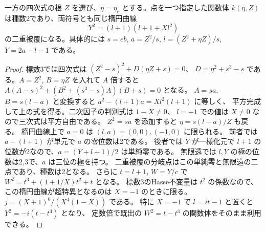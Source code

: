 \begin{corollary}\label{cor:rank-fifteen-unit-elliptic-quotient}
一方の四次式の根 $Z$ を選び、$\eta=\eta_e$ とする。点を一つ指定した関数体
$k(\eta,Z)$ は種数2であり、両符号とも同じ楕円曲線
\[
                 Y^2=(l+1)(l+1+Xl^2)
\]
の二重被覆になる。具体的には $s=e b$, $a=Z^2/s$,
$l=(Z^2+\eta Z)/s$, $Y=2a-l-1$ である。
\end{corollary}
\begin{proof}
標数3では四次式は $(Z^2-s)^2+D(\eta Z+s)=0$、
$D=\eta^2+s^3-s$ である。$A=Z^2$, $B=\eta Z$ を入れて $A$ 倍すると
$A(A-s)^2+(B^2+(s^3-s)A)(B+s)=0$ となる。
$A=sa$, $B=s(l-a)$ と変換すると $a^2-(l+1)a=Xl^2(l+1)$ に等しく、
平方完成して上の式を得る。二次因子の判別式は $1-X\ne0$、
$l=-1$ での値は $X\ne0$ なので三次式は平方自由である。
$Z^2=sa$ を添加すると $\eta=s(l-a)/Z$ も戻る。
楕円曲線上で $a=0$ は $(l,a)=(0,0),(-1,0)$ に限られる。
前者では $a-(l+1)$ が単元で $a$ の零位数は2である。
後者では $Y$ が一様化元で $l+1$ の位数が2なので、$a=(Y+l+1)/2$ は単純零である。
無限遠では $l,Y$ の極の位数は2,3で、$a$ は三位の極を持つ。
二重被覆の分岐点はこの単純零と無限遠の二点であり、種数は2となる。
さらに $t=l+1$, $W=Y/c$ で $W^2=t^3+(1+1/X)t^2+t$ となる。
標数3のHasse不変量は $t^2$ の係数なので、この楕円曲線が超特異となるのは
$X=-1$ のときに限る。$j=(X+1)^6/(X^4(1-X))$ である。
特に $X=-1$ で $l=i t-1$ と置くと $Y^2=-i(t-t^3)$ となり、
定数倍で既出の $W^2=t-t^3$ の関数体をそのまま利用できる。
\end{proof}

